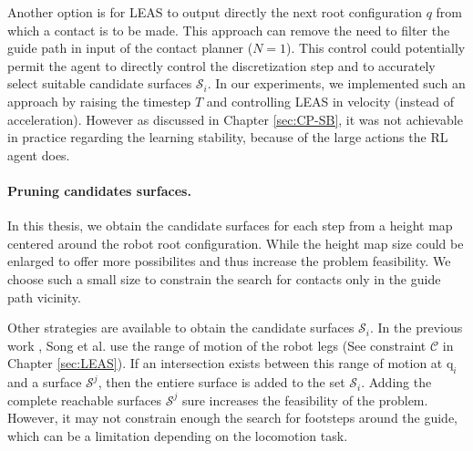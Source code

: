 Another option is for LEAS to output directly the next root configuration $q$ from which a contact is to be made.
This approach can remove the need to filter the guide path in input of the contact planner ($N=1$).
This control could potentially permit the agent to directly control the discretization step and to accurately select suitable candidate surfaces $\mathcal{S}_i$.
In our experiments, we implemented such an approach by raising the timestep $T$ and controlling LEAS in velocity (instead of acceleration). However as discussed in Chapter \ref{sec:CP-SB}, it was not achievable in practice regarding the learning stability, because of the large actions the RL agent does.

\paragraph{Pruning candidates surfaces.\label{subsub:mip:discussion:candidate_surfaces}}
In this thesis, we obtain the candidate surfaces for each step from a height map centered around the robot root configuration. While the height map size could be enlarged to offer more possibilites and thus increase the problem feasibility.
We choose such a small size to constrain the search for contacts only in the guide path vicinity.

Other strategies are available to obtain the candidate surfaces $\mathcal{S}_i$.
In the previous work \cite{sl1m_v2}, Song et al. use the range of motion of the robot legs (See constraint $\mathcal{C}$ in Chapter \ref{sec:LEAS}).
If an intersection exists between this range of motion at $\mbox{q}_i$ and a surface $\mathcal{S}^j$, then the entiere surface is added to the set $\mathcal{S}_i$.
Adding the complete reachable surfaces $\mathcal{S}^j$ sure increases the feasibility of the problem. 
However, it may not constrain enough the search for footsteps around the guide, which can be a limitation depending on the locomotion task.


